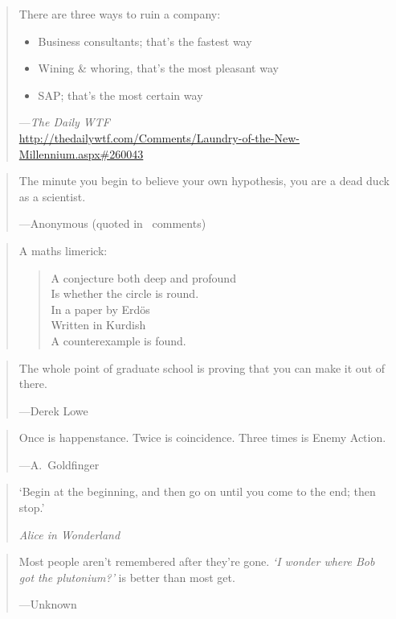 \documentclass[a4paper]{article}
\begin{document}
\medskip
\begin{quote}
	There are three ways to ruin a company:
	\begin{itemize}
		\item Business consultants; that's the fastest way
		\item Wining \& whoring, that's the most pleasant way
		\item SAP; that's the most certain way
	\end{itemize}
	---\emph{The Daily WTF}\\
	\url{http://thedailywtf.com/Comments/Laundry-of-the-New-Millennium.aspx#260043}
\end{quote}

\medskip
\begin{quote}
	The minute you begin to believe your own hypothesis, you
	are a dead duck as a scientist.

	---Anonymous (quoted in~\citet{Reich2009a} comments)
\end{quote}

\medskip
\begin{quote}
	A maths limerick:
	\begin{verse}
		A conjecture both deep and profound \\
		Is whether the circle is round. \\
		In a paper by Erd\"{o}s \\
		Written in Kurdish \\
		A counterexample is found.
	\end{verse}
\end{quote}

\medskip
\begin{quote}
	The whole point of graduate school is proving that you can
	make it out of there.

	---Derek Lowe~\citep{Lowe2006}
\end{quote}

\medskip
\begin{quote}
	Once is happenstance. Twice is coincidence. Three times is Enemy Action.

	---A.~Goldfinger
\end{quote}

\medskip
\begin{quote}
	`Begin at the beginning, and then go on until you come to the
	end; then stop.'

	\emph{Alice in Wonderland}
\end{quote}

\medskip
\begin{quote}
	Most people aren't remembered after they're gone.  \emph{`I
	wonder where Bob got the plutonium?'} is better than most get.

	---Unknown
\end{quote}
\end{document}
